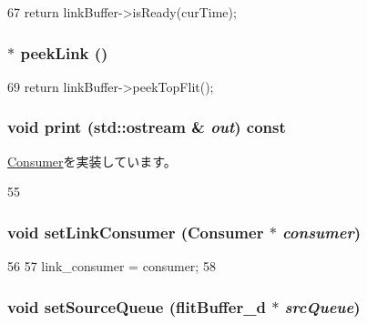 \begin{DoxyCode}
67     { return linkBuffer->isReady(curTime); }
\end{DoxyCode}
\hypertarget{classNetworkLink__d_af2fb50a550cfec574c35b332334846c3}{
\subsubsection[{peekLink}]{$\ast$ peekLink ()}}
\label{classNetworkLink__d_af2fb50a550cfec574c35b332334846c3}



\begin{DoxyCode}
69 { return linkBuffer->peekTopFlit(); }
\end{DoxyCode}
\hypertarget{classNetworkLink__d_ac55fe386a101fbae38c716067c9966a0}{
\subsubsection[{print}]{\setlength{\rightskip}{0pt plus 5cm}void print (std::ostream \& {\em out}) const}}
\label{classNetworkLink__d_ac55fe386a101fbae38c716067c9966a0}


\hyperlink{classConsumer_a3ea5f7af5db62cc24f4e40df9ea5c971}{Consumer}を実装しています。


\begin{DoxyCode}
55 {}
\end{DoxyCode}
\hypertarget{classNetworkLink__d_a0572f6732a488d1b8cc8e494e88d0fb3}{
\subsubsection[{setLinkConsumer}]{\setlength{\rightskip}{0pt plus 5cm}void setLinkConsumer ({\bf Consumer} $\ast$ {\em consumer})}}
\label{classNetworkLink__d_a0572f6732a488d1b8cc8e494e88d0fb3}



\begin{DoxyCode}
56 {
57     link_consumer = consumer;
58 }
\end{DoxyCode}
\hypertarget{classNetworkLink__d_ae50654abbfb3735dc3eb38760f67dd85}{
\subsubsection[{setSourceQueue}]{\setlength{\rightskip}{0pt plus 5cm}void setSourceQueue ({\bf flitBuffer\_\-d} $\ast$ {\em srcQueue})}}
\label{classNetworkLink__d_ae50654abbfb3735dc3eb38760f67dd85}



